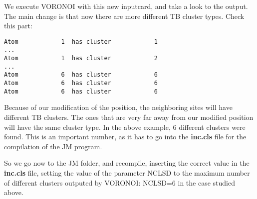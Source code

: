 \documentclass[11pt,fleqn]{book} %
\begin{document}
We execute VORONOI with this new inputcard, and take a look to the output.
The main change is that now there are more different TB cluster types.
Check this part:
\begin{VBox}
\begin{verbatim}
Atom            1  has cluster            1
...
Atom            1  has cluster            2
...
Atom            6  has cluster            6
Atom            6  has cluster            6
Atom            6  has cluster            6
\end{verbatim}
\end{VBox}
Because of our modification of the position, the neighboring sites will have different TB
clusters. The ones that are very  far away from our modified position will have the
same cluster type. In the above example, 6 different clusters were found. This is an
important number, as it has to go into the \textbf{inc.cls} file for
the compilation of the JM program.

So we go now to the JM folder, and recompile, inserting the correct value in
the \textbf{inc.cls} file, setting the value of the parameter NCLSD to
the maximum number of different clusters outputed by VORONOI: NCLSD=6 in the case
studied above.
\end{document}
